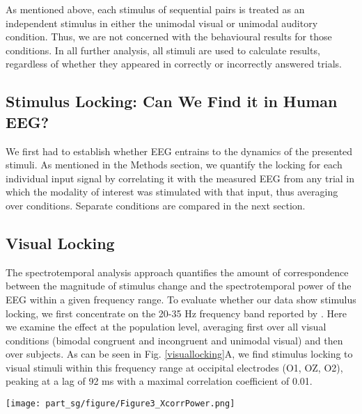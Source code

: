 As mentioned above, each stimulus of sequential pairs is treated as an
independent stimulus in either the unimodal visual or unimodal auditory
condition. Thus, we are not concerned with the behavioural results for
those conditions. In all further analysis, all stimuli are used to
calculate results, regardless of whether they appeared in correctly or
incorrectly answered trials. 



\subsection{Stimulus Locking: Can We Find it in Human EEG?}

We first had to establish whether EEG entrains to the dynamics of the
presented stimuli. As mentioned in the Methods section, we quantify the
locking for each individual input signal by correlating it with the
measured EEG from any trial in which the modality of interest was
stimulated with that input, thus averaging over conditions. Separate
conditions are compared in the next section.



\subsection{Visual Locking}

The spectrotemporal analysis approach quantifies the amount of
correspondence between the magnitude of stimulus change and the
spectrotemporal power of the EEG within a given frequency range. To
evaluate whether our data show stimulus locking, we first concentrate on
the 20-35 Hz frequency band reported by \cite{kayser2004b}. Here we examine
the effect at the population level, averaging first over all visual
conditions (bimodal congruent and incongruent and unimodal visual) and then
over subjects. As can be seen in Fig. \ref{visuallocking}A, we find
stimulus locking to visual stimuli within this frequency range at occipital
electrodes (O1, OZ, O2), peaking at a lag of 92 ms with a maximal
correlation coefficient of 0.01.

\begin{SCfigure}[][!htb]
\texttt{[image: part\_sg/figure/Figure3\_XcorrPower.png]}
\caption[Stimulus Locking of EEG Power to Visual
Stimuli.]{\protect}\label{visuallocking}
\end{SCfigure} 

 

